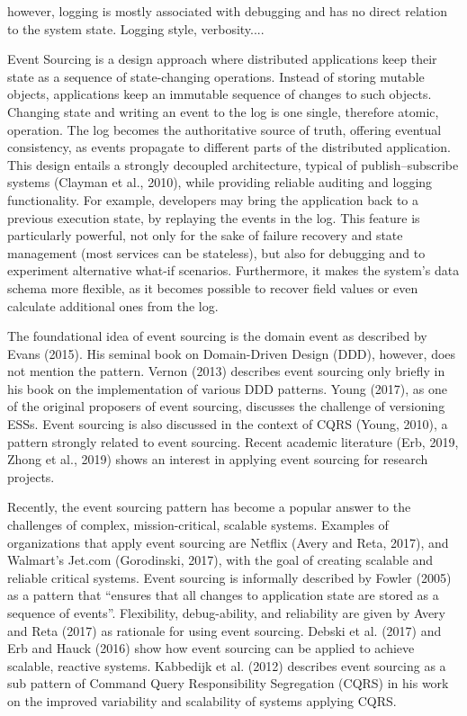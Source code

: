however, logging is mostly associated with debugging and has no direct relation to the system state. Logging style, verbosity....

Event Sourcing is a design approach where distributed applications keep their state as a sequence of state-changing operations. Instead of storing mutable objects, applications keep an immutable sequence of changes to such objects. Changing state and writing an event to the log is one single, therefore atomic, operation. The log becomes the authoritative source of truth, offering eventual consistency, as events propagate to different parts of the distributed application. This design entails a strongly decoupled architecture, typical of publish–subscribe systems (Clayman et al., 2010), while providing reliable auditing and logging functionality. For example, developers may bring the application back to a previous execution state, by replaying the events in the log. This feature is particularly powerful, not only for the sake of failure recovery and state management (most services can be stateless), but also for debugging and to experiment alternative what-if scenarios. Furthermore, it makes the system’s data schema more flexible, as it becomes possible to recover field values or even calculate additional ones from the log.

The foundational idea of event sourcing is the domain event as described by Evans (2015). His seminal book on Domain-Driven Design (DDD), however, does not mention the pattern. Vernon (2013) describes event sourcing only briefly in his book on the implementation of various DDD patterns. Young (2017), as one of the original proposers of event sourcing, discusses the challenge of versioning ESSs. Event sourcing is also discussed in the context of CQRS (Young, 2010), a pattern strongly related to event sourcing. Recent academic literature (Erb, 2019, Zhong et al., 2019) shows an interest in applying event sourcing for research projects.

Recently, the event sourcing pattern has become a popular answer to the challenges of complex, mission-critical, scalable systems. Examples of organizations that apply event sourcing are Netflix (Avery and Reta, 2017), and Walmart’s Jet.com (Gorodinski, 2017), with the goal of creating scalable and reliable critical systems. Event sourcing is informally described by Fowler (2005) as a pattern that “ensures that all changes to application state are stored as a sequence of events”. Flexibility, debug-ability, and reliability are given by Avery and Reta (2017) as rationale for using event sourcing. Debski et al. (2017) and Erb and Hauck (2016) show how event sourcing can be applied to achieve scalable, reactive systems. Kabbedijk et al. (2012) describes event sourcing as a sub pattern of Command Query Responsibility Segregation (CQRS) in his work on the improved variability and scalability of systems applying CQRS.

